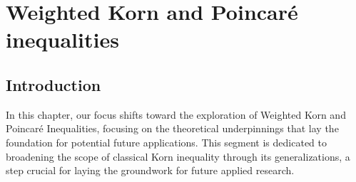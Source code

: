 \chapter{Weighted Korn and Poincaré inequalities}   
\label{chap:wKorn}
\section{Introduction}

In this chapter, our focus shifts toward the exploration of Weighted Korn and Poincaré Inequalities, focusing on the theoretical underpinnings that lay the foundation for potential future applications. This segment is dedicated to broadening the scope of classical Korn inequality through its generalizations, a step crucial for laying the groundwork for future applied research. 

